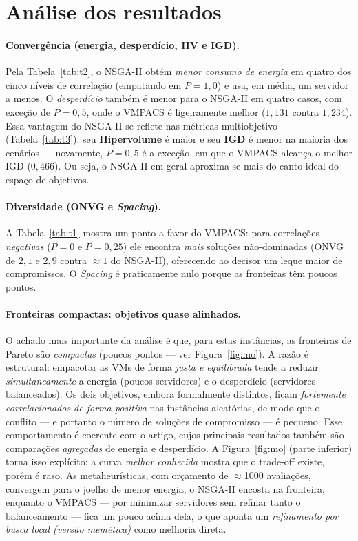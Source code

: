 \documentclass[11pt]{article}
\begin{document}
\section{Análise dos resultados}
\paragraph{Convergência (energia, desperdício, HV e IGD).} Pela
Tabela~\ref{tab:t2}, o NSGA-II obtém \emph{menor consumo de energia} em quatro dos
cinco níveis de correlação (empatando em $P=1{,}0$) e usa, em média, um servidor a
menos. O \emph{desperdício} também é menor para o NSGA-II em quatro casos, com
exceção de $P=0{,}5$, onde o VMPACS é ligeiramente melhor ($1{,}131$ contra
$1{,}234$). Essa vantagem do NSGA-II se reflete nas métricas multiobjetivo
(Tabela~\ref{tab:t3}): seu \textbf{Hipervolume} é maior e seu \textbf{IGD} é menor
na maioria dos cenários --- novamente, $P=0{,}5$ é a exceção, em que o VMPACS
alcança o melhor IGD ($0{,}466$). Ou seja, o NSGA-II em geral aproxima-se mais do
canto ideal do espaço de objetivos.

\paragraph{Diversidade (ONVG e \emph{Spacing}).} A Tabela~\ref{tab:t1} mostra um
ponto a favor do VMPACS: para correlações \emph{negativas} ($P=0$ e $P=0{,}25$)
ele encontra \emph{mais} soluções não-dominadas (ONVG de $2{,}1$ e $2{,}9$ contra
$\approx\!1$ do NSGA-II), oferecendo ao decisor um leque maior de compromissos. O
\emph{Spacing} é praticamente nulo porque as fronteiras têm poucos pontos.

\paragraph{Fronteiras compactas: objetivos quase alinhados.} O achado mais
importante da análise é que, para estas instâncias, as fronteiras de Pareto são
\emph{compactas} (poucos pontos --- ver Figura~\ref{fig:mo}). A razão é estrutural:
empacotar as VMs de forma \emph{justa e equilibrada} tende a reduzir
\emph{simultaneamente} a energia (poucos servidores) e o desperdício (servidores
balanceados). Os dois objetivos, embora formalmente distintos, ficam
\emph{fortemente correlacionados de forma positiva} nas instâncias aleatórias,
de modo que o conflito --- e portanto o número de soluções de compromisso --- é
pequeno. Esse comportamento é coerente com o artigo, cujos principais resultados
também são comparações \emph{agregadas} de energia e desperdício. A Figura~\ref{fig:mo} (parte inferior) torna isso explícito: a curva \emph{melhor conhecida} mostra que o trade-off existe, porém é raso. As metaheurísticas, com orçamento de $\approx$1000 avaliações, convergem para o joelho de menor energia; o NSGA-II encosta na fronteira, enquanto o VMPACS --- por minimizar servidores sem refinar tanto o balanceamento --- fica um pouco acima dela, o que aponta um \emph{refinamento por busca local (versão memética)} como melhoria direta.
\end{document}
